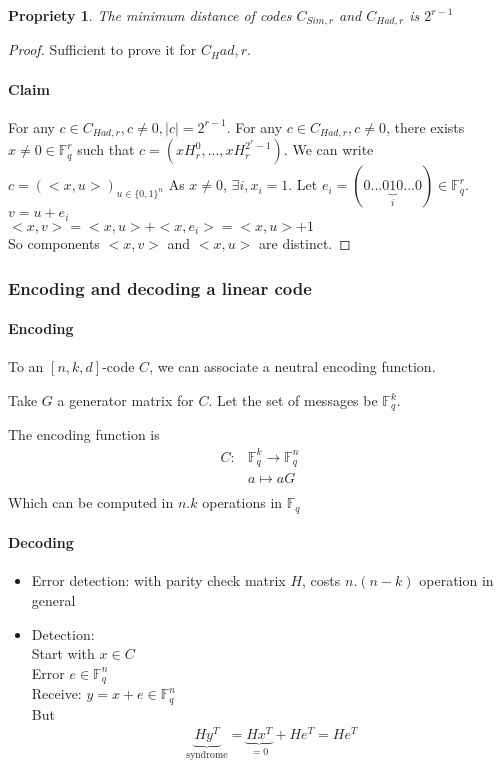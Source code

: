 \documentclass{article}
\newtheorem{prop}{Propriety}
\begin{document}
\begin{prop}
The minimum distance of codes $C_{Sim,r}$ and $C_{Had,r}$ is $2^{r-1}$
\end{prop}

\begin{proof}
Sufficient to prove it for $C_Had,r$.
\paragraph{Claim} For any $c\in C_{Had, r}, c\neq 0, |c|=2^{r-1}$. For any $c\in C_{Had,r}, c\neq 0$, there exists $x\neq 0 \in \mathbb{F}_q^r$ such that $c=(xH_r^0,...,xH_r^{2^r-1})$.
We can write $c=(<x,u>)_{u\in \{0,1\}^n}$
As $x\neq 0$, $\exists i, x_i=1$. Let $e_i=(0...0 \underbrace{1}_i 0...0) \in \mathbb{F}_q^r$.\\
$v=u+e_i$\\
$<x,v>=<x,u>+<x,e_i>=<x,u>+1$\\
So components $<x,v>$ and $<x,u>$ are distinct.
\end{proof}


\subsubsection*{Encoding and decoding a linear code}
\paragraph{Encoding} To an $[n,k,d]$-code $C$, we can associate a neutral encoding function.

Take $G$ a generator matrix for $C$. Let the set of messages be $\mathbb{F}_q^k$.

The encoding function is 
\begin{align*}
C: &\mathbb{F}_q^k \to \mathbb{F}_q^n\\
&a \mapsto aG\\
\end{align*}
Which can be computed in $n.k$ operations in $\mathbb{F}_q$

\paragraph{Decoding}
\begin{itemize}
\item Error detection: with parity check matrix $H$, costs $n.(n-k)$ operation in general
\item Detection:\\
Start with $x \in C$\\
Error $e\in \mathbb{F}_q^n$\\
Receive: $y=x+e\in \mathbb{F}_q^n$\\
But
\begin{align*}
\underbrace{Hy^T}_{\text{syndrome}} = \underbrace{Hx^T}_{=0} + He^T = He^T\\
\end{align*}
\end{itemize}
\end{document}
